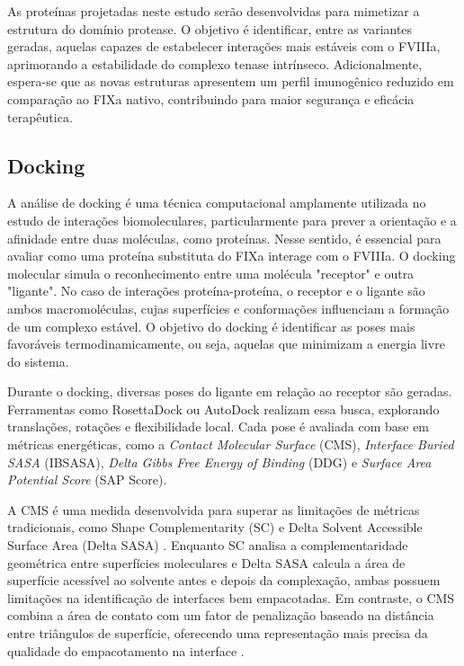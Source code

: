 As proteínas projetadas neste estudo serão desenvolvidas para mimetizar a estrutura do domínio protease.
O objetivo é identificar, entre as variantes geradas, aquelas capazes de estabelecer interações mais estáveis com o FVIIIa,
aprimorando a estabilidade do complexo tenase intrínseco. 
Adicionalmente, espera-se que as novas estruturas apresentem um perfil imunogênico reduzido em comparação ao FIXa nativo, 
contribuindo para maior segurança e eficácia terapêutica.

\subsection{Docking}
A análise de docking é uma técnica computacional amplamente utilizada no estudo de interações biomoleculares,
particularmente para prever a orientação e a afinidade entre duas moléculas,
como proteínas. Nesse sentido, é essencial para avaliar como uma proteína substituta do FIXa interage com o FVIIIa. 
O docking molecular simula o reconhecimento entre uma molécula "receptor" e outra "ligante". 
No caso de interações proteína-proteína, o receptor e o ligante são ambos macromoléculas,
cujas superfícies e conformações influenciam a formação de um complexo estável.
O objetivo do docking é identificar as poses mais favoráveis termodinamicamente, ou seja, 
aquelas que minimizam a energia livre do sistema.

Durante o docking, diversas poses do ligante em relação ao receptor são geradas.
Ferramentas como RosettaDock ou AutoDock realizam essa busca, explorando translações, rotações e flexibilidade local.
Cada pose é avaliada com base em métricas energéticas, como a \textit{Contact Molecular Surface} (CMS), \textit{Interface Buried SASA} (IBSASA),
\textit{Delta Gibbs Free Energy of Binding} (DDG) e \textit{Surface Area Potential Score} (SAP Score).

A CMS é uma medida desenvolvida para superar as limitações de métricas tradicionais, 
como Shape Complementarity (SC) e Delta Solvent Accessible Surface Area (Delta SASA) \cite{Docking}.
Enquanto SC analisa a complementaridade geométrica entre superfícies moleculares e 
Delta SASA calcula a área de superfície acessível ao solvente antes e depois da complexação,
ambas possuem limitações na identificação de interfaces bem empacotadas.
Em contraste, o CMS combina a área de contato com um fator de penalização baseado na distância entre triângulos de superfície,
oferecendo uma representação mais precisa da qualidade do empacotamento na interface \cite{Docking}.

